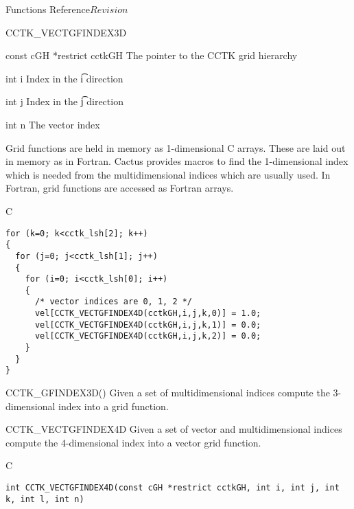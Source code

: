 \begin{cactuspart}{ Functions Reference}{}{$Revision$}
\begin{FunctionDescription}{CCTK\_VECTGFINDEX3D}
\begin{ParameterSection}
\begin{Parameter} {const cGH *restrict cctkGH}
The pointer to the CCTK grid hierarchy
\end{Parameter}

\begin{Parameter} {int i}
Index in the \t{i} direction
\end{Parameter}

\begin{Parameter} {int j}
Index in the \t{j} direction
\end{Parameter}

\begin{Parameter} {int n}
The vector index
\end{Parameter}
\end{ParameterSection}

\begin{Discussion}
Grid functions are held in memory as 1-dimensional C arrays. These are
laid out in memory as in Fortran. Cactus provides macros to find the
1-dimensional index which is needed from the multidimensional indices which
are usually used. In Fortran, grid functions are accessed as Fortran arrays.
\end{Discussion}
\begin{ExampleSection}
\begin{Example}{C}
\begin{verbatim}
for (k=0; k<cctk_lsh[2]; k++)
{
  for (j=0; j<cctk_lsh[1]; j++)
  {
    for (i=0; i<cctk_lsh[0]; i++)
    {
      /* vector indices are 0, 1, 2 */
      vel[CCTK_VECTGFINDEX4D(cctkGH,i,j,k,0)] = 1.0;
      vel[CCTK_VECTGFINDEX4D(cctkGH,i,j,k,1)] = 0.0;
      vel[CCTK_VECTGFINDEX4D(cctkGH,i,j,k,2)] = 0.0;
    }
  }
}
\end{verbatim}
\end{Example}
\end{ExampleSection}
\begin{SeeAlsoSection}
\begin{SeeAlso}{CCTK\_GFINDEX3D()}
Given a set of multidimensional indices compute the 3-dimensional index into a
grid function.
\end{SeeAlso}

\end{SeeAlsoSection}
\end{FunctionDescription}



\begin{FunctionDescription}{CCTK\_VECTGFINDEX4D}
\label{CCTK-VECTGFINDEX4D}
Given a set of vector and multidimensional indices compute the 4-dimensional
index into a vector grid function.
\begin{SynopsisSection}
\begin{Synopsis}{C}
\begin{verbatim}
int CCTK_VECTGFINDEX4D(const cGH *restrict cctkGH, int i, int j, int k, int l, int n)
\end{verbatim}
\end{Synopsis}
\end{SynopsisSection}


\end{FunctionDescription}
\end{cactuspart}
